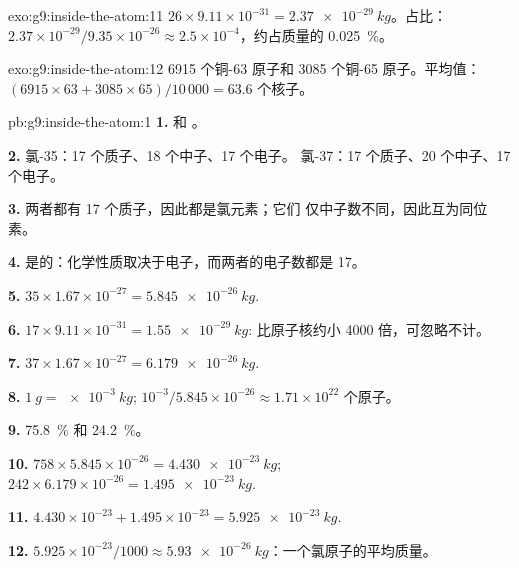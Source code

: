 \begin{solution}{exo:g9:inside-the-atom:11}
$26 \times 9.11 \times 10^{-31} = \qty{2.37e-29}{kg}$。占比：
$2.37 \times 10^{-29} / 9.35 \times 10^{-26} \approx 2.5 \times
10^{-4}$，约占质量的 \qty{0.025}{\percent}。
\end{solution}

\begin{solution}{exo:g9:inside-the-atom:12}
6915 个铜-63 原子和 3085 个铜-65 原子。平均值：
$(6915 \times 63 + 3085 \times 65)/10\,000 = 63.6$ 个核子。
\end{solution}

\begin{solution}{pb:g9:inside-the-atom:1}
\textbf{1.}  和 。

\textbf{2.} 氯-35：17 个质子、18 个中子、17 个电子。
氯-37：17 个质子、20 个中子、17 个电子。

\textbf{3.} 两者都有 17 个质子，因此都是氯元素；它们
仅中子数不同，因此互为同位素。

\textbf{4.} 是的：化学性质取决于电子，而两者的电子数都是 17。

\textbf{5.} $35 \times 1.67 \times 10^{-27} = \qty{5.845e-26}{kg}$.

\textbf{6.} $17 \times 9.11 \times 10^{-31} = \qty{1.55e-29}{kg}$:
比原子核约小 4000 倍，可忽略不计。

\textbf{7.} $37 \times 1.67 \times 10^{-27} = \qty{6.179e-26}{kg}$.

\textbf{8.} $\qty{1}{g} = \qty{e-3}{kg}$; $10^{-3} / 5.845 \times
10^{-26} \approx 1.71 \times 10^{22}$ 个原子。

\textbf{9.} \qty{75.8}{\percent} 和 \qty{24.2}{\percent}。

\textbf{10.} $758 \times 5.845 \times 10^{-26} = \qty{4.430e-23}{kg}$;
$242 \times 6.179 \times 10^{-26} = \qty{1.495e-23}{kg}$.

\textbf{11.} $4.430 \times 10^{-23} + 1.495 \times 10^{-23} =
\qty{5.925e-23}{kg}$.

\textbf{12.} $5.925 \times 10^{-23} / 1000 \approx
\qty{5.93e-26}{kg}$：一个氯原子的平均质量。
\end{solution}
